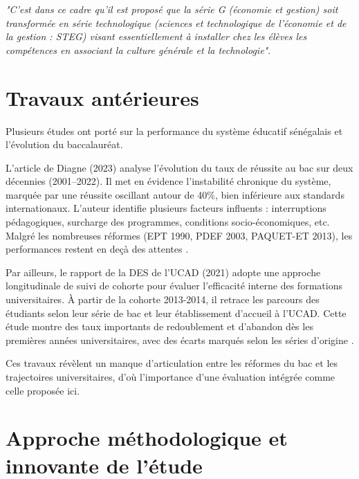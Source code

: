 \textit{"C'est dans ce cadre qu'il est proposé que la série G (économie et gestion) soit transformée en série technologique (sciences et technologique de l'économie et de la gestion : STEG)
visant essentiellement à installer chez les élèves les compétences en associant la culture générale et la technologie"}\cite{decret2019}.

\section{Travaux antérieures }

Plusieurs études ont porté sur la performance du système éducatif sénégalais et l’évolution du baccalauréat.

L’article de Diagne (2023) analyse l’évolution du taux de réussite au bac sur deux décennies (2001–2022). 
Il met en évidence l’instabilité chronique du système, marquée par une réussite oscillant autour de 40\%, bien inférieure aux standards internationaux. 
L’auteur identifie plusieurs facteurs influents : interruptions pédagogiques, surcharge des programmes, conditions socio-économiques, etc. 
Malgré les nombreuses réformes (EPT 1990, PDEF 2003, PAQUET-ET 2013), les performances restent en deçà des attentes \cite{Mbaye2023}.

Par ailleurs, le rapport de la DES de l’UCAD (2021) adopte une approche longitudinale de suivi de cohorte pour évaluer l’efficacité interne des formations universitaires. 
À partir de la cohorte 2013-2014, il retrace les parcours des étudiants selon leur série de bac et leur établissement d’accueil à l’UCAD. 
Cette étude montre des taux importants de redoublement et d’abandon dès les premières années universitaires, avec des écarts marqués selon les séries d’origine \cite{des2021}.

Ces travaux révèlent un manque d’articulation entre les réformes du bac et les trajectoires universitaires, d’où l’importance d’une évaluation intégrée comme celle proposée ici.

\section{Approche méthodologique et innovante de l'étude}

